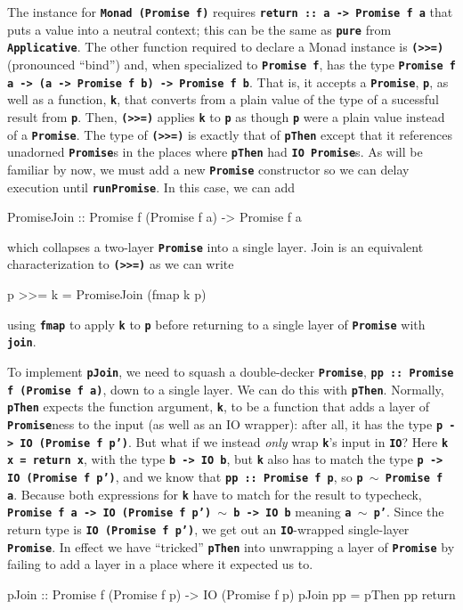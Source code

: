 \documentclass[12pt, english, letterpaper]{kuthesis}
\newcommand{\lit}[1]{\textbf{\texttt{#1}}}
\begin{document}
The instance for \lit{Monad (Promise f)} requires \lit{return ::\ a -> Promise f a} that puts a value into a neutral context; this can be the same as \lit{pure} from \lit{Applicative}.  The other function required to declare a Monad instance is \lit{(>>=)} (pronounced ``bind'') and, when specialized to \lit{Promise f}, has the type \lit{Promise f a -> (a -> Promise f b) -> Promise f b}.  That is, it accepts a \lit{Promise}, \lit p, as well as a function, \lit k, that converts from a plain value of the type of a sucessful result from \lit p.  Then, \lit{(>>=)} applies \lit k to \lit p as though \lit p were a plain value instead of a \lit{Promise}.  The type of \lit{(>>=)} is exactly that of \lit{pThen} except that it references unadorned \lit{Promise}s in the places where \lit{pThen} had \lit{IO Promise}s.  As will be familiar by now, we must add a new \lit{Promise} constructor so we can delay execution until \lit{runPromise}.  In this case, we can add
  \begin{code}
    PromiseJoin :: Promise f (Promise f a) -> Promise f a
  \end{code}
  which collapses a two-layer \lit{Promise} into a single layer.  Join is an equivalent characterization to \lit{(>>=)} as we can write
  \begin{code}
    p >>= k = PromiseJoin (fmap k p)
  \end{code}
  using \lit{fmap} to apply \lit k to \lit p before returning to a single layer of \lit{Promise} with \lit{join}.
  
  To implement \lit{pJoin}, we need to squash a double-decker \lit{Promise}, \lit{pp ::\ Promise f (Promise f a)}, down to a single layer.  We can do this with \lit{pThen}.  Normally, \lit{pThen} expects the function argument, \lit k, to be a function that adds a layer of \lit{Promise}ness to the input (as well as an IO wrapper): after all, it has the type \lit{p -> IO (Promise f p')}.  But what if we instead \emph{only} wrap \lit k's input in \lit{IO}?  Here \lit{k x = return x}, with the type \lit{b -> IO b}, but \lit k also has to match the type \lit{p -> IO (Promise f p')}, and we know that \lit{pp ::\ Promise f p}, so \lit{p \(\sim\) Promise f a}.  Because both expressions for \lit k have to match for the result to typecheck, \lit{Promise f a -> IO (Promise f p') \(\sim\) b -> IO b} meaning \lit{a \(\sim\) p'}.  Since the return type is \lit{IO (Promise f p')}, we get out an \lit{IO}-wrapped single-layer \lit{Promise}.  In effect we have ``tricked'' \lit{pThen} into unwrapping a layer of \lit{Promise} by failing to add a layer in a place where it expected us to.
  \begin{code}
pJoin :: Promise f (Promise f p) -> IO (Promise f p)
pJoin pp = pThen pp return
  \end{code}
  
\end{document}
